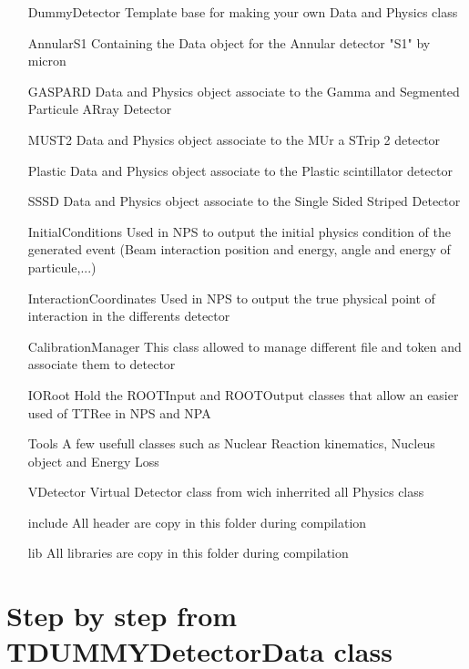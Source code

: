 \documentclass{book}
\begin{document}
		
		\begin{itemize}
			\item[DummyDetector] Template base for making your own Data and Physics class
			\item[AnnularS1] Containing the Data object for the Annular detector "S1" by micron 
			\item[GASPARD] Data and Physics object associate to the Gamma and Segmented Particule ARray Detector
			\item[MUST2] Data and Physics object associate to the MUr a STrip 2 detector
			\item[Plastic] Data and Physics object associate to the Plastic scintillator detector
			\item[SSSD] Data and Physics object associate to the Single Sided Striped Detector
			\item[InitialConditions] Used in NPS to output the initial physics condition of the generated event (Beam interaction position and energy, angle and energy of particule,...)
			\item[InteractionCoordinates] Used in NPS to output the true physical point of interaction in the differents detector
			\item[CalibrationManager] This class allowed to manage different file and token and associate them to detector
			\item[IORoot] Hold the ROOTInput and ROOTOutput classes that allow an easier used of TTRee in NPS and NPA
			\item[Tools] A few usefull classes such as Nuclear Reaction kinematics, Nucleus object and Energy Loss
			\item[VDetector] Virtual Detector class from wich inherrited all Physics class
			\item[include] All header are copy in this folder during compilation
			\item[lib] All libraries are copy in this folder during compilation
		\end{itemize}
		
	\section{Step by step from TDUMMYDetectorData class}
\end{document}
